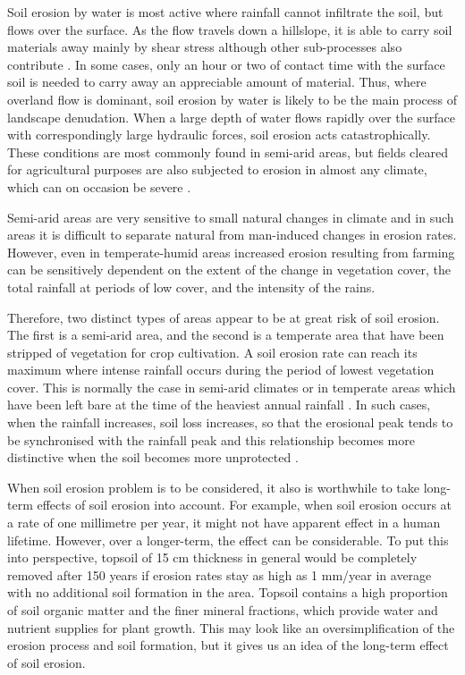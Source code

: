 Soil erosion by water is most active where rainfall cannot infiltrate the soil,
but flows over the surface. As the flow travels down a hillslope, it is able to
carry soil materials away mainly by shear stress although other sub-processes
also contribute \citep[see also Figure
\ref{fig:kinnell}]{kinnell2000-discourse,kinnell2005-2815}. In some
cases, only an hour or two of contact time with the surface soil is needed to
carry away an appreciable amount of material. Thus, where overland flow is
dominant, soil erosion by water is likely to be the main process of landscape
denudation. When a large depth of water flows rapidly over the surface with
correspondingly large hydraulic forces, soil erosion acts catastrophically.
These conditions are most commonly found in semi-arid areas, but fields cleared
for agricultural purposes are also subjected to erosion in almost any climate,
which can on occasion be severe \citep{boardman2001-346,boardman2003-176}.

Semi-arid areas are very sensitive to small natural changes in climate and in
such areas it is difficult to separate natural from man-induced changes in
erosion rates. However, even in temperate-humid areas increased erosion
resulting from farming can be sensitively dependent on the extent of the change
in vegetation cover, the total rainfall at periods of low cover, and the
intensity of the rains.

Therefore, two distinct types of areas appear to be at great risk of soil
erosion. The first is a semi-arid area, and the second is a temperate area that
have been stripped of vegetation for crop cultivation. A soil erosion rate can
reach its maximum where intense rainfall occurs during the period of lowest
vegetation cover. This is normally the case in semi-arid climates or in
temperate areas which have been left bare at the time of the heaviest annual
rainfall \citep{goff1993-698,nearing2005-131}. In such cases, when the rainfall
increases, soil loss increases, so that the erosional peak tends to be
synchronised with the rainfall peak and this relationship becomes more
distinctive when the soil becomes more unprotected
\citep{goff1993-698,nearing2005-131}.

When soil erosion problem is to be considered, it also is worthwhile to take
long-term effects of soil erosion into account. For example, when soil erosion
occurs at a rate of one millimetre per year, it might not have apparent effect
in a human lifetime. However, over a longer-term, the effect can be
considerable. To put this into perspective, topsoil of 15 cm thickness in
general would be completely removed after 150 years if erosion rates stay as
high as 1 mm/year in average with no additional soil formation in the area.
Topsoil contains a high proportion of soil organic matter and the finer mineral
fractions, which provide water and nutrient supplies for plant growth. This may
look like an oversimplification of the erosion process and soil formation, but
it gives us an idea of the long-term effect of soil erosion.


